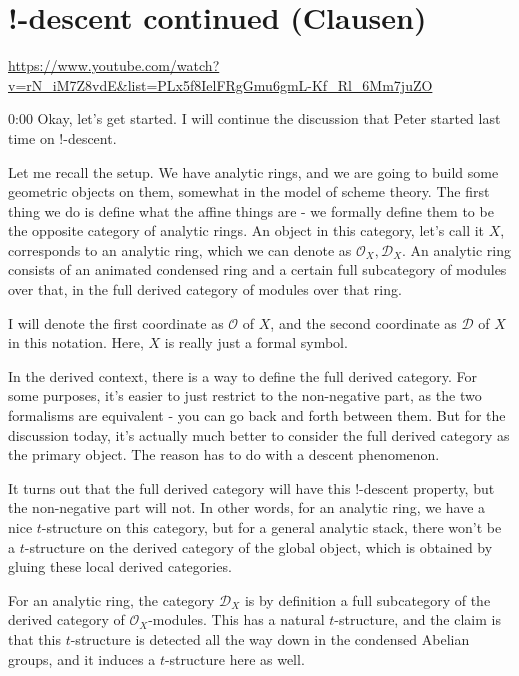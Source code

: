 
\section{\ufs !-descent continued (Clausen)}

\url{https://www.youtube.com/watch?v=rN_iM7Z8vdE&list=PLx5f8IelFRgGmu6gmL-Kf_Rl_6Mm7juZO}
\renewcommand{\yt}[2]{\href{https://www.youtube.com/watch?v=rN_iM7Z8vdE&list=PLx5f8IelFRgGmu6gmL-Kf_Rl_6Mm7juZO&t=#1}{#2}}
\vspace{1em}

\begin{unfinished}{0:00}
  Okay, let's get started. I will continue the discussion that Peter started last time on !-descent.

Let me recall the setup. We have analytic rings, and we are going to build some geometric objects on them, somewhat in the model of scheme theory. The first thing we do is define what the affine things are - we formally define them to be the opposite category of analytic rings. An object in this category, let's call it $X$, corresponds to an analytic ring, which we can denote as $\mathcal{O}_X, \mathcal{D}_X$. An analytic ring consists of an animated condensed ring and a certain full subcategory of modules over that, in the full derived category of modules over that ring.

I will denote the first coordinate as $\mathcal{O}$ of $X$, and the second coordinate as $\mathcal{D}$ of $X$ in this notation. Here, $X$ is really just a formal symbol.

In the derived context, there is a way to define the full derived category. For some purposes, it's easier to just restrict to the non-negative part, as the two formalisms are equivalent - you can go back and forth between them. But for the discussion today, it's actually much better to consider the full derived category as the primary object. The reason has to do with a descent phenomenon.

It turns out that the full derived category will have this !-descent property, but the non-negative part will not. In other words, for an analytic ring, we have a nice $t$-structure on this category, but for a general analytic stack, there won't be a $t$-structure on the derived category of the global object, which is obtained by gluing these local derived categories.

For an analytic ring, the category $\mathcal{D}_X$ is by definition a full subcategory of the derived category of $\mathcal{O}_X$-modules. This has a natural $t$-structure, and the claim is that this $t$-structure is detected all the way down in the condensed Abelian groups, and it induces a $t$-structure here as well.


\end{unfinished}
